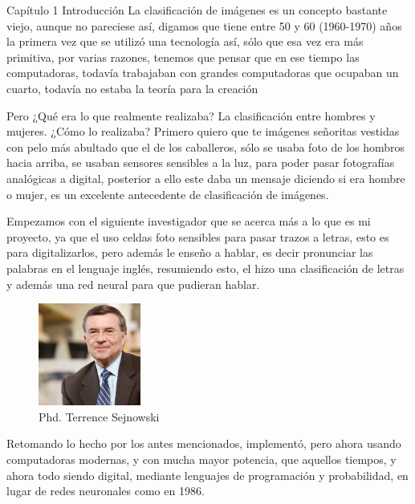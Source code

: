 \documentclass[
  spanish,
  ignorenonframetext,
]{beamer}
\begin{document}
\begin{frame}{Capítulo 1 Introducción}
\protect\hypertarget{capuxedtulo-1-introducciuxf3n}{}
La clasificación de imágenes es un concepto bastante viejo, aunque no
pareciese así, digamos que tiene entre 50 y 60 (1960-1970) años la
primera vez que se utilizó una tecnología así, sólo que esa vez era más
primitiva, por varias razones, tenemos que pensar que en ese tiempo las
computadoras, todavía trabajaban con grandes computadoras que ocupaban
un cuarto, todavía no estaba la teoría para la creación

Pero ¿Qué era lo que realmente realizaba? La clasificación entre hombres
y mujeres. ¿Cómo lo realizaba? Primero quiero que te imágenes señoritas
vestidas con pelo más abultado que el de los caballeros, sólo se usaba
foto de los hombros hacia arriba, se usaban sensores sensibles a la luz,
para poder pasar fotografías analógicas a digital, posterior a ello este
daba un mensaje diciendo si era hombre o mujer, es un excelente
antecedente de clasificación de imágenes.

Empezamos con el siguiente investigador que se acerca más a lo que es mi
proyecto, ya que el uso celdas foto sensibles para pasar trazos a
letras, esto es para digitalizarlos, pero además le enseño a hablar, es
decir pronunciar las palabras en el lenguaje inglés, resumiendo esto, el
hizo una clasificación de letras y además una red neural para que
pudieran hablar.

\begin{figure}
\centering
\includegraphics[width=0.3\textwidth,height=\textheight]{img/README/terrence.jpg}
\caption{Phd. Terrence Sejnowski}
\end{figure}

Retomando lo hecho por los antes mencionados, implementó, pero ahora
usando computadoras modernas, y con mucha mayor potencia, que aquellos
tiempos, y ahora todo siendo digital, mediante lenguajes de programación
y probabilidad, en lugar de redes neuronales como en 1986.
\end{frame}
\end{document}
